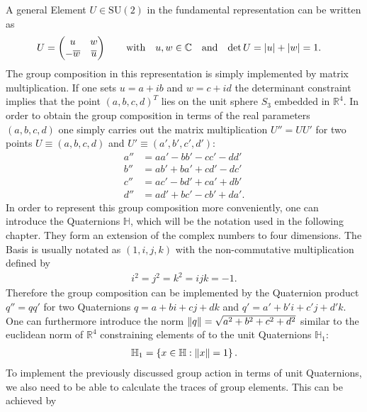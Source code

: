 A general Element $U \in \mathrm{SU}(2)$ in the fundamental representation can be written as
\begin{align}
 U & =
 \begin{pmatrix}
  u             & w            \\
  -\overline{w} & \overline{u}
 \end{pmatrix} \qquad \textrm{with} \quad u,w \in \mathbb{C} \quad \textrm{and} \quad \mathrm{det} \, U = \abs{u} + \abs{w} = 1 \textrm{.}
 \label{eq:generalSu2Element}
\end{align}
The group composition in this representation is simply implemented by matrix multiplication. If one sets $u = a + ib$ and $w = c + id$ the determinant constraint implies that the point $(a,b,c,d)^T$ lies on the unit sphere $S_3$ embedded in $\mathbb{R}^4$. In order to obtain the group composition in terms of the real parameters $(a,b,c,d)$ one simply carries out the matrix multiplication $U'' = U U'$ for two points $U \equiv (a,b,c,d)$ and $U' \equiv (a',b',c',d')$:
\begin{align*}
 a'' & = a a' - b b' - c c' - d d'            \\
 b'' & = a b' + b a' + c d' - d c'            \\
 c'' & = a c' - b d' + c a' + d b'            \\
 d'' & = a d' + b c' - c b' + d a' \textrm{.}
\end{align*}
In order to represent this group composition more conveniently, one can introduce the Quaternions $\mathbb{H}$, which will be the notation used in the following chapter. They form an extension of the complex numbers to four dimensions. The Basis is usually notated as $(1,i,j,k)$ with the non-commutative multiplication defined by
\begin{align*}
 i^2 = j^2 = k^2 = ijk = -1 \textrm{.}
\end{align*}
Therefore the group composition can be implemented by the Quaternion product $q'' = q q'$ for two Quaternions $q = a + bi + cj + dk$ and $q' = a' + b'i + c'j + d'k$. One can furthermore introduce the norm $\norm{q} = \sqrt{a^2 + b^2 + c^2 +d^2}$ similar to the euclidean norm of $\mathbb{R}^4$ constraining elements of \SUTwo to the unit Quaternions $\mathbb{H}_1$:
\begin{align*}
 \mathbb{H}_1 = \left\{ x \in \mathbb{H} : \norm{x} = 1\right\} \textrm{.}
\end{align*}
To implement the previously discussed group action in terms of unit Quaternions, we also need to be able to calculate the traces of group elements. This can be achieved by
